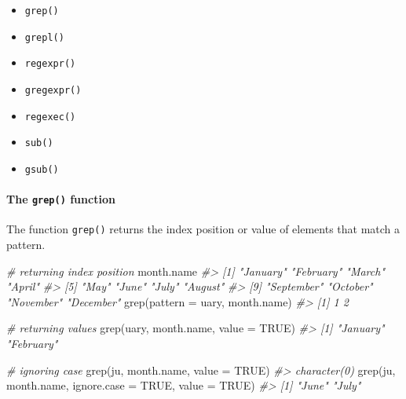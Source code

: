\documentclass[
]{book}
\newenvironment{Shaded}{\begin{snugshade}}{\end{snugshade}}
\newcommand{\AttributeTok}[1]{\textcolor[rgb]{0.77,0.63,0.00}{#1}}
\newcommand{\CommentTok}[1]{\textcolor[rgb]{0.56,0.35,0.01}{\textit{#1}}}
\newcommand{\ConstantTok}[1]{\textcolor[rgb]{0.00,0.00,0.00}{#1}}
\newcommand{\FunctionTok}[1]{\textcolor[rgb]{0.00,0.00,0.00}{#1}}
\newcommand{\NormalTok}[1]{#1}
\newcommand{\StringTok}[1]{\textcolor[rgb]{0.31,0.60,0.02}{#1}}
\providecommand{\tightlist}{%
  \setlength{\itemsep}{0pt}\setlength{\parskip}{0pt}}
\begin{document}
\begin{itemize}
\tightlist
\item
  \texttt{grep()}
\item
  \texttt{grepl()}
\item
  \texttt{regexpr()}
\item
  \texttt{gregexpr()}
\item
  \texttt{regexec()}
\item
  \texttt{sub()}
\item
  \texttt{gsub()}
\end{itemize}

\hypertarget{the-grep-function}{%
\paragraph{\texorpdfstring{The \texttt{grep()} function}{The grep() function}}\label{the-grep-function}}

The function \texttt{grep()} returns the index position or value of elements that match a pattern.

\begin{Shaded}
\begin{Highlighting}[]
\CommentTok{\# returning index position}
\NormalTok{month.name}
\CommentTok{\#\textgreater{}  [1] "January"   "February"  "March"     "April"    }
\CommentTok{\#\textgreater{}  [5] "May"       "June"      "July"      "August"   }
\CommentTok{\#\textgreater{}  [9] "September" "October"   "November"  "December"}
\FunctionTok{grep}\NormalTok{(}\AttributeTok{pattern =} \StringTok{\textquotesingle{}uary\textquotesingle{}}\NormalTok{, month.name)}
\CommentTok{\#\textgreater{} [1] 1 2}

\CommentTok{\# returning values}
\FunctionTok{grep}\NormalTok{(}\StringTok{\textquotesingle{}uary\textquotesingle{}}\NormalTok{, month.name, }\AttributeTok{value =} \ConstantTok{TRUE}\NormalTok{)}
\CommentTok{\#\textgreater{} [1] "January"  "February"}

\CommentTok{\# ignoring case}
\FunctionTok{grep}\NormalTok{(}\StringTok{\textquotesingle{}ju\textquotesingle{}}\NormalTok{, month.name, }\AttributeTok{value =} \ConstantTok{TRUE}\NormalTok{)}
\CommentTok{\#\textgreater{} character(0)}
\FunctionTok{grep}\NormalTok{(}\StringTok{\textquotesingle{}ju\textquotesingle{}}\NormalTok{, month.name, }\AttributeTok{ignore.case =} \ConstantTok{TRUE}\NormalTok{, }\AttributeTok{value =} \ConstantTok{TRUE}\NormalTok{)}
\CommentTok{\#\textgreater{} [1] "June" "July"}
\end{Highlighting}
\end{Shaded}
\end{document}
